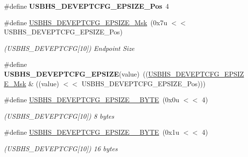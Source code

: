 \begin{DoxyCompactItemize}
\mbox{\label{group__SAMS70__USBHS_ga9680371b4a34336747267e14d1f6bf4c}} 
\#define {\bfseries U\+S\+B\+H\+S\+\_\+\+D\+E\+V\+E\+P\+T\+C\+F\+G\+\_\+\+E\+P\+S\+I\+Z\+E\+\_\+\+Pos}~4
\item 
\mbox{\label{group__SAMS70__USBHS_ga5e7d8a83079e1c65a44d5028003969e0}} 
\#define \mbox{\hyperlink{group__SAMS70__USBHS_ga5e7d8a83079e1c65a44d5028003969e0}{U\+S\+B\+H\+S\+\_\+\+D\+E\+V\+E\+P\+T\+C\+F\+G\+\_\+\+E\+P\+S\+I\+Z\+E\+\_\+\+Msk}}~(0x7u $<$$<$ U\+S\+B\+H\+S\+\_\+\+D\+E\+V\+E\+P\+T\+C\+F\+G\+\_\+\+E\+P\+S\+I\+Z\+E\+\_\+\+Pos)
\begin{DoxyCompactList}\small\item\em (U\+S\+B\+H\+S\+\_\+\+D\+E\+V\+E\+P\+T\+C\+FG\mbox{[}10\mbox{]}) Endpoint Size \end{DoxyCompactList}\item 
\mbox{\label{group__SAMS70__USBHS_ga00d0483c92acda760b06343a5291bc53}} 
\#define {\bfseries U\+S\+B\+H\+S\+\_\+\+D\+E\+V\+E\+P\+T\+C\+F\+G\+\_\+\+E\+P\+S\+I\+ZE}(value)~((\mbox{\hyperlink{group__SAMV71__USBHS_ga5e7d8a83079e1c65a44d5028003969e0}{U\+S\+B\+H\+S\+\_\+\+D\+E\+V\+E\+P\+T\+C\+F\+G\+\_\+\+E\+P\+S\+I\+Z\+E\+\_\+\+Msk}} \& ((value) $<$$<$ U\+S\+B\+H\+S\+\_\+\+D\+E\+V\+E\+P\+T\+C\+F\+G\+\_\+\+E\+P\+S\+I\+Z\+E\+\_\+\+Pos)))
\item 
\mbox{\label{group__SAMS70__USBHS_ga76ef3637dc2e686e84af8f8a8dd47c75}} 
\#define \mbox{\hyperlink{group__SAMS70__USBHS_ga76ef3637dc2e686e84af8f8a8dd47c75}{U\+S\+B\+H\+S\+\_\+\+D\+E\+V\+E\+P\+T\+C\+F\+G\+\_\+\+E\+P\+S\+I\+Z\+E\+\_\+\_\+\+B\+Y\+TE}}~(0x0u $<$$<$ 4)
\begin{DoxyCompactList}\small\item\em (U\+S\+B\+H\+S\+\_\+\+D\+E\+V\+E\+P\+T\+C\+FG\mbox{[}10\mbox{]}) 8 bytes \end{DoxyCompactList}\item 
\mbox{\label{group__SAMS70__USBHS_ga028f507272a99734cc04ae02211133f4}} 
\#define \mbox{\hyperlink{group__SAMS70__USBHS_ga028f507272a99734cc04ae02211133f4}{U\+S\+B\+H\+S\+\_\+\+D\+E\+V\+E\+P\+T\+C\+F\+G\+\_\+\+E\+P\+S\+I\+Z\+E\+\_\+\_\+\+B\+Y\+TE}}~(0x1u $<$$<$ 4)
\begin{DoxyCompactList}\small\item\em (U\+S\+B\+H\+S\+\_\+\+D\+E\+V\+E\+P\+T\+C\+FG\mbox{[}10\mbox{]}) 16 bytes \end{DoxyCompactList}\item 

\end{DoxyCompactItemize}
